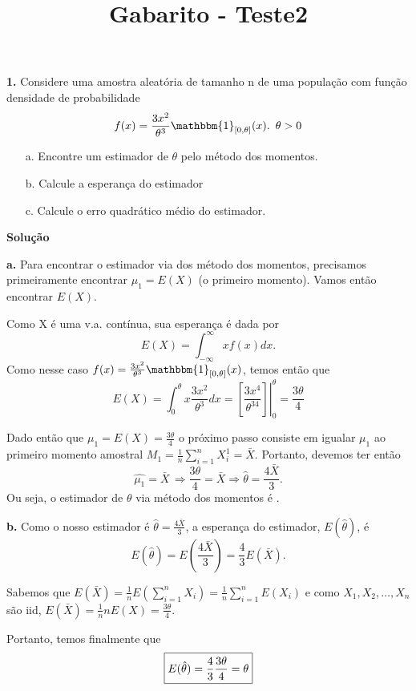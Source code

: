 \documentclass[12pt,a4paper]{article}
\title{Gabarito - Teste2}
\date{}
\begin{document}
\maketitle

\textbf{1.} Considere uma amostra aleatória de tamanho n de uma população com função densidade de probabilidade $$f(x) = \frac{3x^2}{\theta^3} \mathbbm{1}_{[0,\theta]}(x). \, \, \, \theta > 0$$

\begin{itemize}
	\item[a.] Encontre um estimador de $\theta$ pelo método dos momentos.
	\item[b.] Calcule a esperança do estimador
	\item[c.] Calcule o erro quadr\'atico m\'edio do estimador.
\end{itemize}

\textbf{Solução}
\bigskip

\textbf{a.} Para encontrar o estimador via dos método dos momentos, precisamos primeiramente encontrar $\mu_1 = E(X)$ (o primeiro momento). Vamos então encontrar $E(X)$. 

Como X é uma v.a. contínua, sua esperança é dada por $$E(X) = \int_{-\infty}^{\infty} xf(x)dx.$$ Como nesse caso $f(x) = \frac{3x^2}{\theta^3} \mathbbm{1}_{[0,\theta]}(x)$, temos então que $$E(X) = \int_{0}^{\theta} x\frac{3x^2}{\theta^3}dx = \left.\left[\frac{3x^4}{\theta^34}\right]\right|_{0}^{\theta} = \frac{3\theta}{4}$$

Dado então que $\mu_1 = E(X) = \frac{3\theta}{4}$ o próximo passo consiste em igualar $\mu_1$ ao primeiro momento amostral $M_1 = \frac{1}{n}\sum_{i=1}^n X_i^1 = \bar{X}$. Portanto, devemos ter então $$\hat{\mu_1} = \bar{X} \, \Rightarrow \frac{3\theta}{4}=\bar{X} \Rightarrow \hat{\theta} = \frac{4\bar{X}}{3}.$$ Ou seja, o estimador de $\theta$ via método dos momentos é .

\bigskip

\textbf{b.} Como o nosso estimador é $\hat{\theta} = \frac{4\bar{X}}{3}$, a esperança do estimador, $E(\hat{\theta})$, é $$E(\hat{\theta}) = E(\frac{4\bar{X}}{3}) = \frac{4}{3}E(\bar{X}).$$

Sabemos que $E(\bar{X}) = \frac{1}{n}E(\sum_{i=1}^nX_i) = \frac{1}{n}\sum_{i=1}^nE(X_i)$ e como $X_1, X_2, \dots, X_n$ são iid, $E(\bar{X}) = \frac{1}{n}nE(X) = \frac{3\theta}{4}$. 

Portanto, temos finalmente que $$\fbox{$E(\hat{\theta}) = \dfrac{4}{3}\dfrac{3\theta}{4} = 
\theta$}$$
\end{document}
